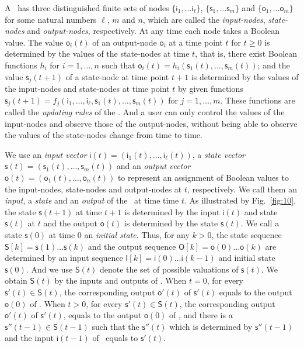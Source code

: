 A \BCN\ has three distinguished finite sets of nodes $\{\mathsf{i}_1,\ldots\mathsf{i}_\ell\}$, $\{\mathsf{s}_1,\ldots\mathsf{s}_m\}$ and $\{\mathsf{o}_1,\ldots\mathsf{o}_m\}$ for some natural numbers $\ell$, $m$ and $n$, which are called the {\em input-nodes}, {\em state-nodes}  and {\em output-nodes}, respectively. At any time each node takes a Boolean value. The value $\mathsf{o}_i(t)$ of an output-node $\mathsf{o}_i$ at a time point $t$ for $t\ge0$ is determined by the values of the state-nodes at time $t$, that is, there exist Boolean functions $h_i$ for $i=1,\ldots,n$ such that $\mathsf{o}_i(t)=h_i(\mathsf{s}_1(t),\ldots,\mathsf{s}_m(t))$; and the value $\mathsf{s}_j(t+1)$ of a state-node at time point $t+1$ is determined by the values of the input-nodes and state-nodes at time point $t$ by given functions $\mathsf{s}_j(t+1)=f_j(\mathsf{i}_1,\ldots,\mathsf{i}_\ell,\mathsf{s}_1(t),\ldots,\mathsf{s}_m(t))$ for $j=1,\ldots,m$. These functions are called the {\em updating rules} of the \BCN. And a user can only control the  values of the input-nodes and observe those of the output-nodes, without being able to observe the values of the state-nodes change from time to time. 

We use an {\em input vector} $\mathsf{i}(t)=(\mathsf{i}_1(t),\ldots,\mathsf{i}_\ell (t))$, a {\em state vector} $\mathsf{s}(t)=(\mathsf{s}_1(t), \ldots, \mathsf{s}_m(t))$ and an {\em output  vector} $\mathsf{o}(t)=(\mathsf{o}_1(t),\ldots, \mathsf{o}_n(t))$  to represent an assignment of Boolean values to the  input-nodes, state-nodes and  output-nodes at $t$, respectively.  We call them an {\em input}, a {\em state} and an {\em output} of the \BCN\ at time time $t$. As  illustrated by Fig.~\ref{fig:10},  the state $\mathsf{s}(t+1)$ at time $t+1$ is determined by the input $\mathsf{i}(t)$ and state $\mathsf{s}(t)$ at $t$  and the output $\mathsf{o}(t)$  is determined by the state  $\mathsf{s}(t)$.  We call a state $\mathsf{s}(0)$ at time $0$ an {\em initial state}. Thus, for any $k>0$, the state sequence  $\mathsf{S}[k]=\mathsf{s}(1)\ldots\mathsf{s}(k)$ and the output sequence $\mathsf{O}[k]=\mathsf{o}(0)\ldots\mathsf{o}(k)$ are  determined by an  input sequence $\mathsf{I}[k]=\mathsf{i}(0)\ldots\mathsf{i}(k-1)$ and initial state $\mathsf{s}(0)$. And we use $\mathsf{S}(t)$ denote the set of possible valuations of $\mathsf{s}(t)$. We obtain $\mathsf{S}(t)$ by the inputs and outputs of \BCN. When $t=0$, for every $\mathsf{s}'(t)\in\mathsf{S}(t)$, the corresponding output $\mathsf{o}'(t)$ of $\mathsf{s}'(t)$ equals to the output $\mathsf{o}(0)$ of \BCN. When $t>0$, for every $\mathsf{s}'(t)\in\mathsf{S}(t)$, the corresponding output $\mathsf{o}'(t)$ of $\mathsf{s}'(t)$, equals to the output $\mathsf{o}(0)$ of \BCN, and there is a $\mathsf{s}''(t-1)\in\mathsf{S}(t-1)$ such that the $\mathsf{s}''(t)$ which is determined by $\mathsf{s}''(t-1)$ and the input $\mathsf{i}(t-1)$ of \BCN\ equals to $\mathsf{s}'(t)$.

